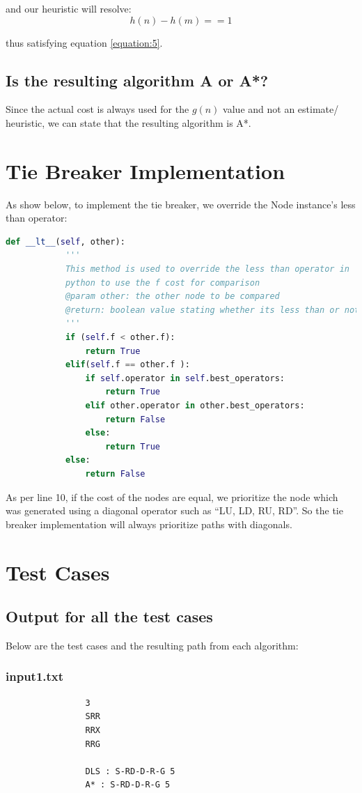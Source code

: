 \documentclass{article}
\begin{document}
	and our heuristic will resolve:
	\begin{equation}
		h(n) - h(m) == 1
	\end{equation}
	
	thus satisfying equation \ref{equation:5}.
	
		\subsection{Is the resulting algorithm A or A*?}
		Since the actual cost is always used for the $g(n)$ value and not an estimate/ heuristic, we can state that the resulting algorithm is A*. 
		
	\section{Tie Breaker Implementation}
	
	As show below, to implement the tie breaker, we override the Node instance's less than operator:
			\begin{lstlisting}[language=Python]
    def __lt__(self, other):
			'''
			This method is used to override the less than operator in
			python to use the f cost for comparison
			@param other: the other node to be compared
			@return: boolean value stating whether its less than or not
			'''
			if (self.f < other.f):
				return True
			elif(self.f == other.f ):
				if self.operator in self.best_operators:
					return True
				elif other.operator in other.best_operators:
					return False
				else:
					return True
			else:
				return False
	\end{lstlisting}
	
	As per line 10, if the cost of the nodes are equal, we prioritize the node which was generated using a diagonal operator such as ``LU, LD, RU, RD''. So the tie breaker implementation will always prioritize paths with diagonals.
	
	\section{Test Cases}
	\subsection{Output for all the test cases}
		Below are the test cases and the resulting path from each algorithm:
		
		\subsubsection{input1.txt}
			\begin{lstlisting}
				3
				SRR
				RRX
				RRG
					
				DLS : S-RD-D-R-G 5
				A* : S-RD-D-R-G 5
		\end{lstlisting}
	\newpage
\end{document}

